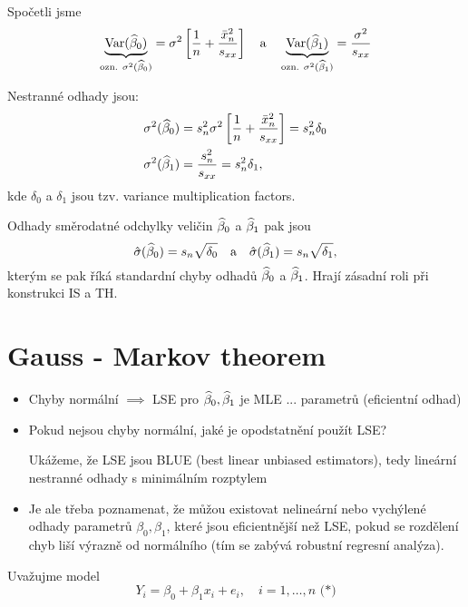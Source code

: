 \begin{remark}
	Spočetli jsme
	\begin{equation*}
		\underbrace{\mathrm{Var}(\widehat{\beta}_0)}_{\text{ozn. } \sigma^2(\widehat{\beta}_0)} = \sigma^2 \left[ \frac{1}{n} + \frac{\bar{x}_n^2}{s_{xx}} \right] \quad \text{a} \quad \underbrace{\mathrm{Var}(\widehat{\beta}_1)}_{\text{ozn. } \sigma^2(\widehat{\beta}_1)} = \frac{\sigma^2}{s_{xx}}
	\end{equation*}
	
	Nestranné odhady jsou:
	\begin{align*}
		\sigma^2(\widehat{\beta}_0) & = s_n^2 \sigma^2 \left[ \frac{1}{n} + \frac{\bar{x}_n^2}{s_{xx}} \right] = s_n^2 \delta_0 \\
		\sigma^2(\widehat{\beta}_1) & = \frac{s_n^2}{s_{xx}} = s_n^2 \delta_1,
	\end{align*}
	kde $\delta_0$ a $\delta_1$ jsou tzv. variance multiplication factors.
	
	Odhady směrodatné odchylky veličin $\widehat{\beta}_0$ a $\widehat{\beta}_1$ pak jsou
	\begin{equation*}
		\hat{\sigma}(\widehat{\beta}_0) = s_n \sqrt{\delta_0} \quad \text{a} \quad \hat{\sigma}(\widehat{\beta}_1) = s_n \sqrt{\delta_1},
	\end{equation*}
	kterým se pak říká standardní chyby odhadů $\widehat{\beta}_0$ a $\widehat{\beta}_1$. Hrají zásadní roli při konstrukci IS a TH.
\end{remark}

\section{Gauss - Markov theorem}

\begin{itemize}
	\item Chyby normální $\implies$ LSE pro $\widehat{\beta}_0, \widehat{\beta}_1$ je MLE ... parametrů (eficientní odhad)
	\item Pokud nejsou chyby normální, jaké je opodstatnění použít LSE?
	
	Ukážeme, že LSE jsou BLUE (best linear unbiased estimators), tedy lineární nestranné odhady s minimálním rozptylem
	\item Je ale třeba poznamenat, že můžou existovat nelineární nebo vychýlené odhady parametrů $\beta_0, \beta_1$, které jsou eficientnější než LSE, pokud se rozdělení chyb liší výrazně od normálního (tím se zabývá robustní regresní analýza).
\end{itemize}

Uvažujme model
\begin{equation*}
	Y_i = \beta_0 + \beta_1 x_i + e_i, \quad i = 1, \dots, n \text{ (*)}
\end{equation*}

